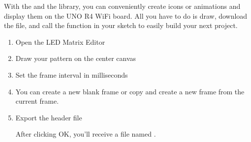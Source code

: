 \documentclass[a4paper,11pt,english]{sphinxmanual}
\begin{document}
\sphinxAtStartPar
With the  and the  library, you can conveniently create icons or animations and display them on the UNO R4 WiFi board. All you have to do is draw, download the  file, and call the  function in your sketch to easily build your next project.
\begin{enumerate}
%
\item {} 
\sphinxAtStartPar
Open the LED Matrix Editor

\noindent{}

\item {} 
\sphinxAtStartPar
Draw your pattern on the center canvas

\noindent{}

\item {} 
\sphinxAtStartPar
Set the frame interval in milliseconds

\noindent{}

\item {} 
\sphinxAtStartPar
You can create a new blank frame or copy and create a new frame from the current frame.

\noindent{}

\item {} 
\sphinxAtStartPar
Export the  header file

\noindent{}

\noindent{}

\sphinxAtStartPar
After clicking OK, you’ll receive a file named .

\end{enumerate}
\end{document}
